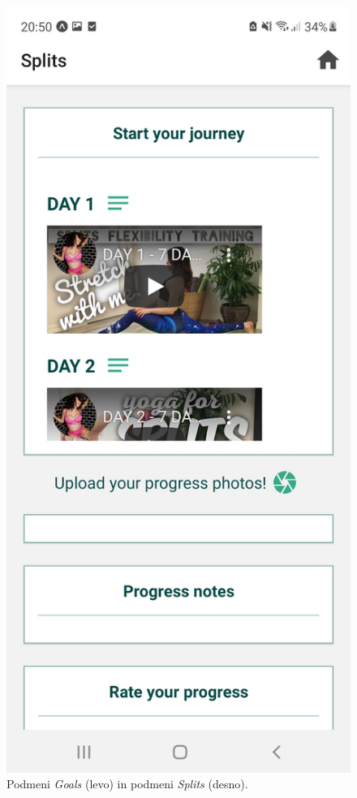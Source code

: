 \documentclass[a4paper, 12pt]{book}
\begin{document}
\begin{figure}[ht]
\begin{minipage}[b]{0.49\textwidth}
  \end{minipage}
  \begin{minipage}[b]{0.49\textwidth}
    \includegraphics[width=\textwidth]{splits.jpg}\centering
  \end{minipage}
    \caption{Podmeni \textit{Goals} (levo) in podmeni \textit{Splits} (desno).}
    \label{goals}
\end{figure}
\end{document}
